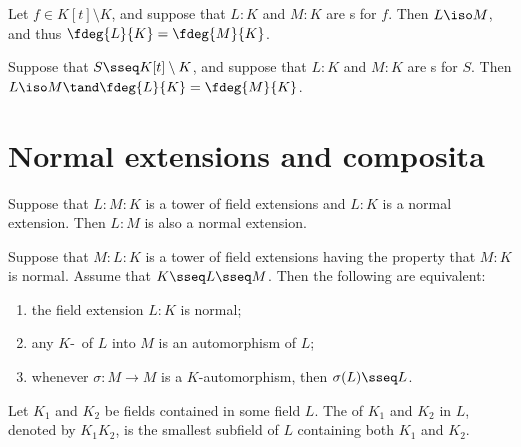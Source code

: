 \documentclass{article}
\begin{document}
\begin{ttheorem}
  Let $ f\in K[t]\setminus K $, and suppose that $ L:K $ and $ M:K $ are \sfe s for $ f $.
  Then $ L\iso M $, and thus $ \fdeg{L}{K}=\fdeg{M}{K} $.
\end{ttheorem}

\begin{ttheorem}
  Suppose that $ S\sseq K[t]\setminus K $, and suppose that $ L:K $ and $ M:K $ are \sfe s for $ S $.
  Then $ L\iso M\tand \fdeg{L}{K}=\fdeg{M}{K} $.
\end{ttheorem}

\section{Normal extensions and composita}

\begin{tproposition}
  Suppose that $ L:M:K $ is a tower of field extensions and $ L:K $ is a normal extension.
  Then $ L:M $ is also a normal extension.
\end{tproposition}

\begin{ttheorem}
  Suppose that $ M:L:K $ is a tower of field extensions having the property that $ M:K $ is normal.
  Assume that $ K\sseq L\sseq M $.
  Then the following are equivalent: \begin{enumerate}[label=(\roman*)]
    \item the field extension $ L:K $ is normal;
    \item any $ K $-\homo~of $ L $ into $ M $ is an automorphism of $ L $;
    \item whenever $ \sigma:M\to M $ is a $ K $-automorphism, then $ \sigma(L)\sseq L $.
  \end{enumerate}
\end{ttheorem}

\begin{tdefinition}[Compositum]
  Let $ K_1 $ and $ K_2 $ be fields contained in some field $ L $.
  The  of $ K_1 $ and $ K_2 $ in $ L $, denoted by $ K_1K_2 $, is the smallest subfield of $ L $ containing both $ K_1 $ and $ K_2 $.
\end{tdefinition}
\end{document}
